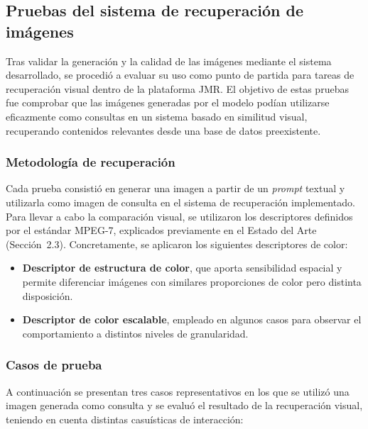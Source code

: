 \subsection{Pruebas del sistema de recuperación de imágenes}

Tras validar la generación y la calidad de las imágenes mediante el sistema desarrollado, se procedió a evaluar su uso como punto de partida para tareas de recuperación visual dentro de la plataforma JMR. El objetivo de estas pruebas fue comprobar que las imágenes generadas por el modelo podían utilizarse eficazmente como consultas en un sistema basado en similitud visual, recuperando contenidos relevantes desde una base de datos preexistente.

\subsubsection{Metodología de recuperación}

Cada prueba consistió en generar una imagen a partir de un \textit{prompt} textual y utilizarla como imagen de consulta en el sistema de recuperación implementado. Para llevar a cabo la comparación visual, se utilizaron los descriptores definidos por el estándar MPEG-7, explicados previamente en el Estado del Arte (Sección~2.3). Concretamente, se aplicaron los siguientes descriptores de color:

\begin{itemize}
    \item \textbf{Descriptor de estructura de color}, que aporta sensibilidad espacial y permite diferenciar imágenes con similares proporciones de color pero distinta disposición.
    \item \textbf{Descriptor de color escalable}, empleado en algunos casos para observar el comportamiento a distintos niveles de granularidad.
\end{itemize}

\subsubsection{Casos de prueba}

A continuación se presentan tres casos representativos en los que se utilizó una imagen generada como consulta y se evaluó el resultado de la recuperación visual, teniendo en cuenta distintas casuísticas de interacción:

